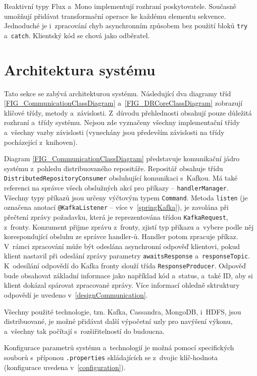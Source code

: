 \noindent Reaktivní typy Flux a~Mono implementují rozhraní poskytovatele. Současně umožňují přidávat transformační operace ke každému elementu sekvence. Jednoduché je i~zpracování chyb asynchronním způsobem bez použití bloků \texttt{try} a~\texttt{catch}. Klientský kód se chová jako odběratel.

\section{Architektura systému} \label{architecture}
Tato sekce se zabývá architekturou systému. Následující dva diagramy tříd \ref{FIG_CommunicationClassDiagram} a~\ref{FIG_DRCoreClassDiagram} zobrazují klíčové třídy, metody a~závislosti. Z~důvodu přehlednosti obsahují pouze důležitá rozhraní a~třídy systému. Nejsou zde vyznačeny všechny implementační třídy a~všechny vazby závislosti (vynechány jsou především závislosti na třídy pocházející z~knihoven).

Diagram \ref{FIG_CommunicationClassDiagram} představuje komunikační jádro systému z~pohledu distribuovaného repositáře. Repositář obsahuje třídu \texttt{DistributedRepositoryConsumer} obsluhující komunikaci s~Kafkou. Má také referenci na správce všech obslužných akcí pro příkazy -- \texttt{handlerManager}. Všechny typy příkazů jsou určeny výčtovým typem \texttt{Command}. Metoda \texttt{listen} (je označena anotací \texttt{@KafkaListener} -- více v~\ref{springKafka}), je zavolána při přečtení zprávy požadavku, která je reprezentována třídou \texttt{KafkaRequest}, z~fronty. Konzument přijme zprávu z~fronty, zjistí typ příkazu a~vybere podle něj korespondující obsluhu ze správce handler-ů. Handler potom zpracuje příkaz. V~rámci zpracování může být odeslána asynchronní odpověď klientovi, pokud klient nastavil při odeslání zprávy parametry \texttt{awaitsResponse} a~\texttt{responseTopic}. K~odesílání odpovědí do Kafka fronty slouží třída \texttt{ResponseProducer}. Odpověď bude obsahovat základní informace jako například kód a~status, a~také ID, aby si klient dokázal spárovat zpracované zprávy. Více informací ohledně sktruktury odpovědí je uvedeno v~\ref{designCommunication}.

Všechny použité technologie, tzn. Kafka, Cassandra, MongoDB, i~HDFS, jsou distribuované, je možné přidávat další výpočetní uzly pro navýšení výkonu, a~všechny tak počítají s~rozšiřitelností do budoucna.

Konfigurace parametrů systému a~technologií je možná pomocí specifických souborů s~příponou \texttt{.properties} skládajících se z~dvojic klíč-hodnota (konfigurace uvedena v~\ref{configuration}).

